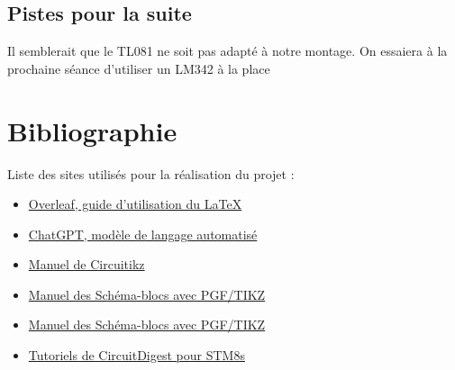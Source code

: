 \documentclass[11pt,a4paper]{article}
\begin{document}
\subsection{Pistes pour la suite}
Il semblerait que le TL081 ne soit pas adapté à notre montage. On essaiera à la prochaine séance d'utiliser un LM342 à la place

\pagebreak
\section{Bibliographie}
Liste des sites utilisés pour la réalisation du projet :
\begin{itemize}
\item \href{https://www.overleaf.com/learn}{Overleaf, guide d'utilisation du \LaTeX{}}
\item \href{https://chat.openai.com/chat}{ChatGPT, modèle de langage automatisé}
\item \href{https://ctan.mines-albi.fr/graphics/pgf/contrib/circuitikz/doc/circuitikzmanual.pdf}{Manuel de Circuitikz}
\item \href{https://sciences-indus-cpge.papanicola.info/IMG/pdf/schemabloc.pdf}{Manuel des Schéma-blocs avec PGF/TIKZ}
\item \href{https://sciences-indus-cpge.papanicola.info/IMG/pdf/schemabloc.pdf}{Manuel des Schéma-blocs avec PGF/TIKZ}
\item \href{https://circuitdigest.com/microcontroller-projects/getting-started-with-stm8s-using-stvd-and-cosmic-c-compiler}{Tutoriels de CircuitDigest pour STM8s}
\end{itemize}
\end{document}
